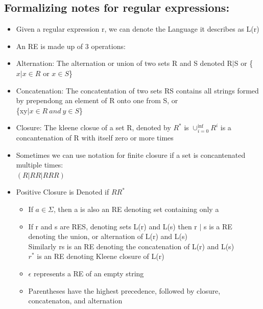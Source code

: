 \documentclass[20pt]{article}
\begin{document}
    \subsection*{Formalizing notes for regular expressions: }
                \begin{itemize}
                    \item Given a regular expression r, we can denote the Language it describes as L(r)
                    \item An RE is made up of 3 operations:
                    \item Alternation: The alternation or union of two sets R and S denoted R$|$S or \{$x|x \in R$ or $x \in S $\}  
                    \item Concatenation: The concatentation of two sets RS contains all strings formed by prependong an element of R onto one from S,
                    or \\\{xy$|x \in R \: and \: y \in S $\}
                    \item Closure: The kleene closue of a set R, denoted by $R^*$ is $\cup_{i = 0}^{\inf} R^i$ is a concantenation of R with itself zero or more times
                    \item Sometimes we can use notation for finite closure if a set is concantenated multiple times: \\
                    $(R|RR|RRR)$
                    \item Positive Closure is Denoted if $RR^*$
                    \begin{itemize}
                        \item If  $ a\in \Sigma$, then a is also an RE denoting set containing only a
			\item If r and s are RES, denoting sets L(r) and L(s) then r $|$ s is a RE denoting the union, or alternation of L(r) and L(s)\\
			Similarly rs is an RE denoting the concatenation of L(r) and L(s)\\
			$r^*$ is an RE denoting Kleene closure of L(r)
			\item $\epsilon$ represents a RE of an empty string
			\item Parentheses have the highest precedence, followed by closure, concatenaton, and alternation
                    \end{itemize}

\end{itemize}
\end{document}
